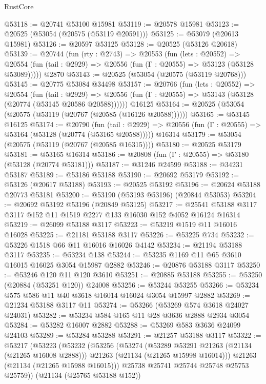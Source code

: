 \begin{lexlean}{RustCore}
\begin{coremodule}
@53118 := @20741 @53100 @15981
@53119 := @20578 @15981
@53123 := @20525 (@53054 (@20575 (@53119 @20591)))
@53125 := @53079 (@20613 @15981)
@53126 := @20597 @53125
@53128 := @20525 (@53126 @20618)
@53139 := @20744
    (fun (rty : @2743) =>
    @20553
      (fun (lets : @20552) =>
      @20554 (fun (tail : @2929) => @20556 (fun (Γ : @20555) => @53123 (@53128 @53089)))))
    @2870
@53143 := @20525 (@53054 (@20575 (@53119 @20768)))
@53145 := @20775 @53084 @34498
@53157 := @20766
    (fun (lets : @20552) =>
    @20554
      (fun (tail : @2929) =>
      @20556 (fun (Γ : @20555) => @53143 (@53128 (@20774 (@53145 @20586 @20588))))))
    @16125
@53164 := @20525 (@53054 (@20575 (@53119 (@20767 (@20585 (@16126 @20588))))))
@53165 := @53145 @16125
@53174 := @20790
    (fun (tail : @2929) => @20556 (fun (Γ : @20555) => @53164 (@53128 (@20774 (@53165 @20588)))))
    @16314
@53179 := @53054 (@20575 (@53119 (@20767 (@20585 @16315))))
@53180 := @20525 @53179
@53181 := @53165 @16314
@53186 := @20808 (fun (Γ : @20555) => @53180 (@53128 (@20774 @53181)))
@53187 := @31246 @24599
@53188 := @34231 @53187
@53189 := @53186 @53188
@53190 := @20692 @53179
@53192 := @53126 (@20617 @53188)
@53193 := @20525 @53192
@53196 := @20624 @53188 @20773 @53181
@53200 := @53190 (@53193 @53196) (@20844 @53053)
@53204 := @20692 @53192 @53196 (@20849 @53125)
@53217 := @25541 @53188 @3117 @3117 @152 @11 @1519 @2277 @133 @16030 @152 @4052 @16124 @16314
@53219 := @26099 @53188 @3117
@53223 := @53219 @1519 @11 @16016 @16028
@53225 := @21181 @53188 @3117
@53226 := @53225 @734
@53232 := @53226 @1518 @66 @11 @16016 @16026 @4142
@53234 := @21194 @53188 @3117
@53235 := @53234 @138
@53244 := @53235 @1169 @11 @65 @3610 @16015 @16025 @3054 @15987 @2882
@53246 := @20876 @53188 @3117
@53250 := @53246 @120 @11 @120 @3610
@53251 := @20885 @53188
@53255 := @53250 (@20884 (@53251 @120)) @24008
@53256 := @53244 @53255
@53266 := @53234 @575 @586 @11 @40 @3618 @16014 @16024 @3054 @15997 @2882
@53269 := @21234 @53188 @3117 @11
@53274 := @53266 (@53269 @574 @3618 @24027 @24031)
@53282 := @53234 @584 @165 @11 @28 @3636 @2888 @2934 @3054
@53284 := @53282 @16007 @2882
@53288 := @53269 @583 @3636 @24099 @24103
@53289 := @53284 @53288
@53291 := @21257 @53188 @3117
@53322 := @53217
    (@53223
      (@53232
        (@53256
          (@53274
            (@53289 @53291 @21263 (@21134 (@21265 @16008 @2888)))
            @21263
            (@21134 (@21265 @15998 @16014)))
          @21263
          (@21134 (@21265 @15988 @16015)))
        @25738
        @25741
        @25744
        @25748
        @25753
        @25759))
    (@21134 (@25765 @53188 @152))

\end{coremodule}
\end{lexlean}
